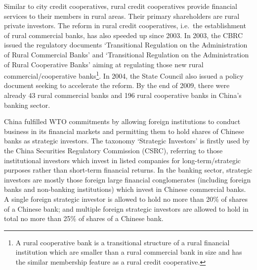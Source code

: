 \documentclass[
  letterpaper,
  DIV=11,
  numbers=noendperiod]{scrreprt}
\begin{document}
Similar to city credit cooperatives, rural credit cooperatives provide
financial services to their members in rural areas. Their primary
shareholders are rural private investors. The reform in rural credit
cooperatives, i.e.~the establishment of rural commercial banks, has also
speeded up since 2003. In 2003, the CBRC issued the regulatory documents
`Transitional Regulation on the Administration of Rural Commercial
Banks' and `Transitional Regulation on the Administration of Rural
Cooperative Banks' aiming at regulating those new rural
commercial/cooperative banks\footnote{A rural cooperative bank is a
  transitional structure of a rural financial institution which are
  smaller than a rural commercial bank in size and has the similar
  membership feature as a rural credit cooperative.}. In 2004, the State
Council also issued a policy document seeking to accelerate the reform.
By the end of 2009, there were already 43 rural commercial banks and 196
rural cooperative banks in China's banking sector.

China fulfilled WTO commitments by allowing foreign institutions to
conduct business in its financial markets and permitting them to hold
shares of Chinese banks as strategic investors. The taxonomy `Strategic
Investors' is firstly used by the China Securities Regulatory Commission
(CSRC), referring to those institutional investors which invest in
listed companies for long-term/strategic purposes rather than short-term
financial returns. In the banking sector, strategic investors are mostly
those foreign large financial conglomerates (including foreign banks and
non-banking institutions) which invest in Chinese commercial banks. A
single foreign strategic investor is allowed to hold no more than 20\%
of shares of a Chinese bank; and multiple foreign strategic investors
are allowed to hold in total no more than 25\% of shares of a Chinese
bank.
\end{document}
